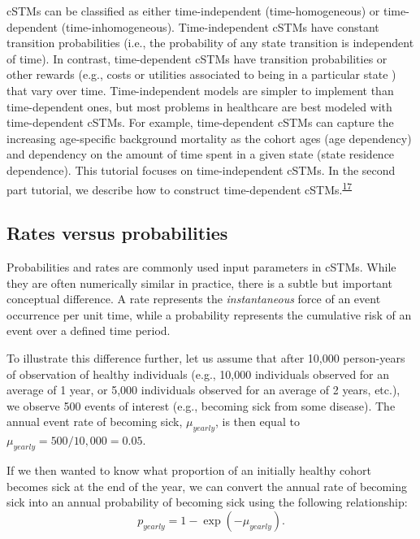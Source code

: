 \documentclass[
]{article}
\begin{document}
cSTMs can be classified as either time-independent (time-homogeneous) or time-dependent (time-inhomogeneous). Time-independent cSTMs have constant transition probabilities (i.e., the probability of any state transition is independent of time). In contrast, time-dependent cSTMs have transition probabilities or other rewards (e.g., costs or utilities associated to being in a particular state ) that vary over time. Time-independent models are simpler to implement than time-dependent ones, but most problems in healthcare are best modeled with time-dependent cSTMs. For example, time-dependent cSTMs can capture the increasing age-specific background mortality as the cohort ages (age dependency) and dependency on the amount of time spent in a given state (state residence dependence). This tutorial focuses on time-independent cSTMs. In the second part tutorial, we describe how to construct time-dependent cSTMs.\textsuperscript{\protect\hyperlink{ref-Alarid-Escudero2021b}{17}}

\hypertarget{rates-versus-probabilities}{%
\subsection{Rates versus probabilities}\label{rates-versus-probabilities}}

Probabilities and rates are commonly used input parameters in cSTMs. While they are often numerically similar in practice, there is a subtle but important conceptual difference. A rate represents the \textit{instantaneous} force of an event occurrence per unit time, while a probability represents the cumulative risk of an event over a defined time period.

To illustrate this difference further, let us assume that after 10,000 person-years of observation of healthy individuals (e.g., 10,000 individuals observed for an average of 1 year, or 5,000 individuals observed for an average of 2 years, etc.), we observe 500 events of interest (e.g., becoming sick from some disease). The annual event rate of becoming sick, \(\mu_{yearly}\), is then equal to \(\mu_{yearly}=500 / 10,000=0.05\).

If we then wanted to know what proportion of an initially healthy cohort becomes sick at the end of the year, we can convert the annual rate of becoming sick into an annual probability of becoming sick using the following relationship:
\begin{equation}
    p_{yearly} = 1-\exp{\left(-\mu_{yearly} \right)}.
    \label{eq:rate-to-prob-ann}
\end{equation}
\end{document}
